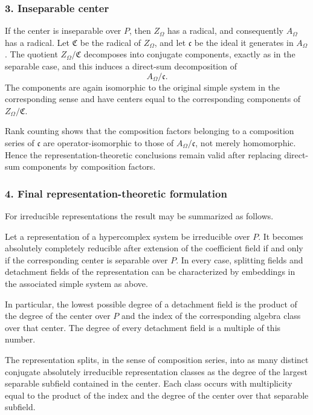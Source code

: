 \documentclass[11pt]{article}
\begin{document}
\subsubsection{3. Inseparable center}\label{inseparable-center}

If the center is inseparable over \(P\), then \(Z_\Omega\) has a
radical, and consequently \(A_\Omega\) has a radical. Let
\(\mathfrak C\) be the radical of \(Z_\Omega\), and let \(\mathfrak c\)
be the ideal it generates in \(A_\Omega\). The quotient
\(Z_\Omega/\mathfrak C\) decomposes into conjugate components, exactly
as in the separable case, and this induces a direct-sum decomposition of
\[
  A_\Omega/\mathfrak c.
\] The components are again isomorphic to the original simple system in
the corresponding sense and have centers equal to the corresponding
components of \(Z_\Omega/\mathfrak C\).

Rank counting shows that the composition factors belonging to a
composition series of \(\mathfrak c\) are operator-isomorphic to those
of \(A_\Omega/\mathfrak c\), not merely homomorphic. Hence the
representation-theoretic conclusions remain valid after replacing
direct-sum components by composition factors.

\subsubsection{4. Final representation-theoretic
formulation}\label{final-representation-theoretic-formulation}

For irreducible representations the result may be summarized as follows.

Let a representation of a hypercomplex system be irreducible over \(P\).
It becomes absolutely completely reducible after extension of the
coefficient field if and only if the corresponding center is separable
over \(P\). In every case, splitting fields and detachment fields of the
representation can be characterized by embeddings in the associated
simple system as above.

In particular, the lowest possible degree of a detachment field is the
product of the degree of the center over \(P\) and the index of the
corresponding algebra class over that center. The degree of every
detachment field is a multiple of this number.

The representation splits, in the sense of composition series, into as
many distinct conjugate absolutely irreducible representation classes as
the degree of the largest separable subfield contained in the center.
Each class occurs with multiplicity equal to the product of the index
and the degree of the center over that separable subfield.
\end{document}
